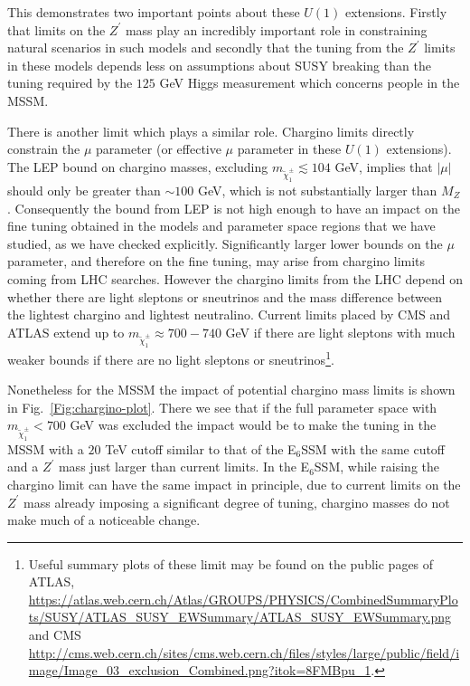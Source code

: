 \documentclass[preprint,amsmath,amssymb,aps,superscriptaddress,prd,
showpacs,floatfix,nofootinbib]{revtex4-1}
\begin{document}
This demonstrates two important points about these $U(1)$
extensions.  Firstly that limits on the $Z^\prime$ mass play an
incredibly important role in constraining natural scenarios in such
models and secondly that the tuning from the $Z^\prime$ limits in
these models depends less on assumptions about SUSY breaking than the
tuning required by the $125$ GeV Higgs measurement which concerns
people in the MSSM.

There is another limit which plays a similar role.  Chargino limits
directly constrain the $\mu$ parameter (or effective $\mu$ parameter
in these $U(1)$ extensions).  The LEP bound \cite{Kraan:2005vy} on
chargino masses, excluding $m_{\tilde{\chi}^\pm_1} \lesssim 104$ GeV, implies
that $|\mu|$ should only be greater than $\sim 100$ GeV, which is not
substantially larger than $M_Z$.  Consequently the bound from LEP is not
high enough to have an impact on the fine tuning obtained in the models and
parameter space regions that we have studied, as we have checked explicitly.
Significantly larger lower bounds on the $\mu$ parameter, and therefore on the
fine tuning, may arise from chargino limits coming from LHC searches.  However
the chargino limits from the LHC depend on whether there are light sleptons or
sneutrinos and the mass difference between the lightest chargino and lightest
neutralino.  Current limits placed by CMS and ATLAS extend up to
$m_{\tilde{\chi}^\pm_1} \approx 700 - 740$ GeV if there are light
sleptons \cite{Khachatryan:2014qwa, Aad:2014nua} with much weaker
bounds if there are no light sleptons or sneutrinos\footnote{Useful
summary plots of these limit may be found on the public pages of
ATLAS, \url{https://atlas.web.cern.ch/Atlas/GROUPS/PHYSICS/CombinedSummaryPlots/SUSY/ATLAS_SUSY_EWSummary/ATLAS_SUSY_EWSummary.png}
and CMS \url{http://cms.web.cern.ch/sites/cms.web.cern.ch/files/styles/large/public/field/image/Image_03_exclusion_Combined.png?itok=8FMBpu_1}.}.

Nonetheless for the MSSM the impact of potential chargino mass limits is
shown in Fig.~\ref{Fig:chargino-plot}.  There we see that if the
full parameter space with $m_{\tilde{\chi}^\pm_1} < 700$ GeV was excluded the
impact would be to make the tuning in the MSSM with a $20$ TeV cutoff
similar to that of the E$_6$SSM with the same cutoff and a
$Z^\prime$ mass just larger than current limits.  In the E$_6$SSM,
while raising the chargino limit can have the same impact in
principle, due to current limits on the $Z^\prime$ mass already
imposing a significant degree of tuning, chargino masses do not make
much of a noticeable change.
\end{document}
